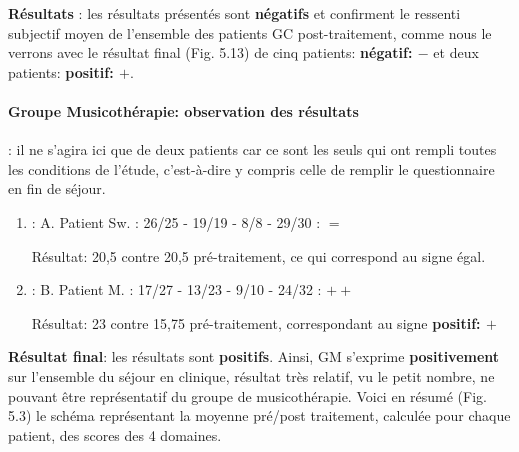    
   \textbf{ Résultats }: les résultats présentés sont  \textbf{négatifs} 
   et confirment le ressenti subjectif moyen de l'ensemble des patients
   GC post-traitement,  comme nous le verrons avec  le résultat final  (Fig. 5.13) de
   cinq patients:  \textbf{négatif:  $-$} et deux patients:  \textbf{positif:  $+$}.
   
\paragraph {Groupe Musicothérapie: observation des résultats}
: il ne s'agira ici que de  deux patients car ce sont les seuls qui ont rempli toutes les conditions de 
l'étude, 
 c'est-à-dire y compris celle de remplir le questionnaire en fin de séjour.
 
 \begin{enumerate}
 	\item : A. Patient Sw. : 26/25 - 19/19 - 8/8 - 29/30 :   $=$
 	
 	
 	
 	Résultat: 20,5 contre 20,5 pré-traitement, ce qui
 	correspond au signe égal.
 	
 	
 	
 	\item : B. Patient M. : 17/27 - 13/23 -  9/10 - 24/32 :  $++$
 	
 	Résultat: 23 contre 15,75 pré-traitement, correspondant
 	au signe \textbf{positif: $+$}
 \end{enumerate}
 \textbf{ Résultat final}: les résultats sont \textbf{positifs}.
 Ainsi,  GM s'exprime
 \textbf{positivement}
 sur l'ensemble du séjour en clinique, résultat très relatif, vu le petit nombre, ne pouvant être  
 représentatif du 
 groupe de 
 musicothérapie.
 Voici en résumé (Fig. 5.3) le schéma représentant la moyenne pré/post traitement, calculée pour chaque 
 patient, des scores des 4 domaines.
 
